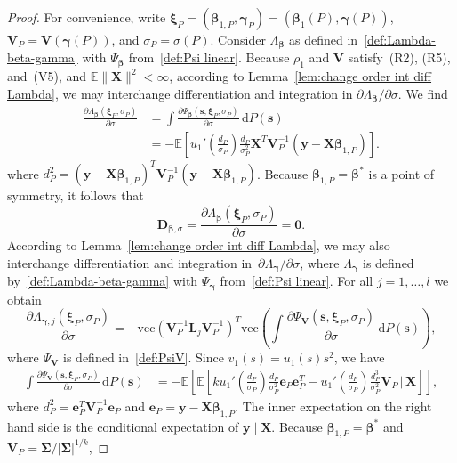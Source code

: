 \documentclass{article}
\numberwithin{equation}{section}
\theoremstyle{plain}
\newcommand{\dd}{\mathrm{d}}
\newcommand{\vc}{\mathrm{vec}}
\newcommand{\bbeta}{\bm\beta}
\newcommand{\bxi}{\bm\xi}
\newcommand{\bgamma}{\bm\gamma}
\newcommand{\bSigma}{\mathbf{\Sigma}}
\newcommand{\by}{\mathbf{y}}
\newcommand{\bs}{\mathbf{s}}
\newcommand{\be}{\mathbf{e}}
\newcommand{\bX}{\mathbf{X}}
\newcommand{\bV}{\mathbf{V}}
\newcommand{\bD}{\mathbf{D}}
\newcommand{\bL}{\mathbf{L}}
\newcommand{\E}{\mathbb{E}}
\begin{document}
\begin{proof}
For convenience, write $\bxi_P=(\bbeta_{1,P},\bgamma_P)=(\bbeta_1(P),\bgamma(P))$,
$\bV_P=\bV(\bgamma(P))$, and $\sigma_P=\sigma(P)$.
Consider $\Lambda_{\bbeta}$ as defined in~\eqref{def:Lambda-beta-gamma} with $\Psi_{\bbeta}$ 
from~\eqref{def:Psi linear}.
Because $\rho_1$ and $\bV$ satisfy~(R2), (R5), and~(V5), and $\E\|\bX\|^2<\infty$,
according to Lemma~\ref{lem:change order int diff Lambda},
we may interchange differentiation and integration in $\partial\Lambda_{\bbeta}/\partial\sigma$.
We find
\[
\begin{split}
\frac{\partial\Lambda_{\bbeta}(\bxi_P,\sigma_P)}{\partial\sigma}
&=
\int 
\frac{\partial\Psi_{\bbeta}(\bs,\bxi_P,\sigma_P)}{\partial\sigma}
\,\text{d}P(\bs)\\
&=
-
\E\left[
u_1'\left(\frac{d_P}{\sigma_P}\right)\frac{d_P}{\sigma_P^2}
\bX^T\bV_P^{-1}(\by-\bX\bbeta_{1,P})
\right].
\end{split}
\]
where $d_P^2=(\by-\bX\bbeta_{1,P})^T\bV_P^{-1}(\by-\bX\bbeta_{1,P})$.
Because $\bbeta_{1,P}=\bbeta^*$ is a point of symmetry,
it follows that 
\begin{equation}
\label{eq:Dbeta-sigma=0}
\bD_{\bbeta,\sigma}
=
\frac{\partial\Lambda_{\bbeta}(\bxi_P,\sigma_P)}{\partial\sigma}
=
\mathbf{0}.
\end{equation}
According to Lemma~\ref{lem:change order int diff Lambda},
we may also interchange differentiation and integration
in~$\partial\Lambda_{\bgamma}/\partial \sigma$,
where $\Lambda_{\bgamma}$ is defined by~\eqref{def:Lambda-beta-gamma} with $\Psi_{\bgamma}$
from~\eqref{def:Psi linear}.
For all $j=1,\ldots,l$ we obtain
\[
\frac{\partial\Lambda_{\bgamma,j}(\bxi_P,\sigma_P)}{\partial \sigma}
=
-
\vc\left(\bV_P^{-1}\bL_j\bV_P^{-1}\right)^T\vc\left(
\int
\frac{\partial\Psi_{\bV}(\bs,\bxi_P,\sigma_P)}{\partial \sigma}
\,\dd P(\bs)
\right),
\]
where $\Psi_\bV$ is defined in~\eqref{def:PsiV}.
Since $v_1(s)=u_1(s)s^2$, we have 
\[
\begin{split}
\int
\frac{\partial\Psi_{\bV}(\bs,\bxi_P,\sigma_P)}{\partial \sigma}\,\dd P(\bs)
&=
-\E
\left[
\E
\left[
ku_1'\left(\frac{d_P}{\sigma_P}\right)
\frac{d_P}{\sigma_P^2}
\be_P\be_P^T
-
u_1'\left(\frac{d_P}{\sigma_P}\right)
\frac{d_P^3}{\sigma_P^2}\bV_P
\,\Bigg|\,
\bX
\right]
\right],
\end{split}
\]
where $d^2_P=\be_P^T\bV_P^{-1}\be_P$ and $\be_P=\by-\bX\bbeta_{1,P}$.
The inner expectation on the right hand side is the conditional expectation of $\by\mid\bX$.
Because $\bbeta_{1,P}=\bbeta^*$ and $\bV_P=\bSigma/|\bSigma|^{1/k}$,

\end{proof}
\end{document}
